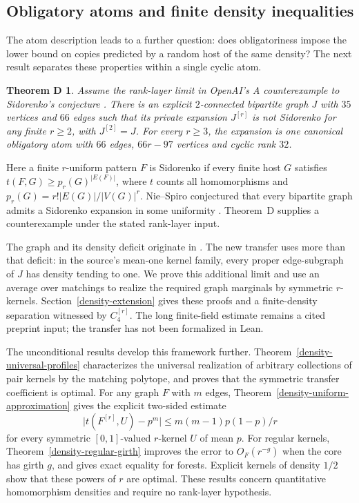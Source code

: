\documentclass[a4paper,11pt,reqno]{amsart}
\theoremstyle{plain}
\newtheorem*{theoremD}{Theorem D}
\theoremstyle{definition}
\theoremstyle{remark}
\begin{document}
\subsection*{Obligatory atoms and finite density inequalities}
The atom description leads to a further question: does obligatoriness
impose the lower bound on copies predicted by a random host of the
same density?  The next result separates these properties within a
single cyclic atom.

\begin{theoremD}
Assume the rank-layer limit in OpenAI's
\emph{A counterexample to Sidorenko's conjecture} \citep{openai161}.
There is an explicit $2$-connected bipartite graph $J$ with $35$
vertices and $66$ edges such that its private expansion $J^{[r]}$
is not Sidorenko for any finite $r\ge2$, with $J^{[2]}=J$.
For every $r\ge3$, the expansion is one canonical obligatory atom
with $66$ edges, $66r-97$ vertices and cyclic rank $32$.
\end{theoremD}

Here a finite $r$-uniform pattern $F$ is Sidorenko if every finite
host $G$ satisfies $t(F,G)\ge p_r(G)^{|E(F)|}$, where $t$ counts all
homomorphisms and $p_r(G)=r!|E(G)|/|V(G)|^r$.
Nie--Spiro conjectured that every bipartite graph admits a Sidorenko
expansion in some uniformity \citep[Conjecture~5.1]{niespiro2025}.
Theorem~D supplies a counterexample under the stated rank-layer input.

The graph and its density deficit originate in \citet{openai161}.
The new transfer uses more than that deficit: in the source's
mean-one kernel family, every proper edge-subgraph of $J$ has density
tending to one.  We prove this additional limit and use an average
over matchings to realize the required graph marginals by symmetric
$r$-kernels.  Section~\ref{density-extension} gives these proofs and
a finite-density separation witnessed by $C_4^{[r]}$.
The long finite-field estimate remains a cited preprint input;
the transfer has not been formalized in Lean.

The unconditional results develop this framework further.
Theorem~\ref{density-universal-profiles} characterizes the universal
realization of arbitrary collections of pair kernels by the matching
polytope, and proves that the symmetric transfer coefficient is optimal.
For any graph $F$ with $m$ edges, Theorem~\ref{density-uniform-approximation}
gives the explicit two-sided estimate
\[
 \bigl|t(F^{[r]},U)-p^m\bigr|
 \le m(m-1)p(1-p)/r
\]
for every symmetric $[0,1]$-valued $r$-kernel $U$ of mean $p$.
For regular kernels, Theorem~\ref{density-regular-girth} improves the
error to $O_F(r^{-g})$ when the core has girth $g$, and gives exact
equality for forests.  Explicit kernels of density $1/2$ show that
these powers of $r$ are optimal.  These results concern quantitative
homomorphism densities and require no rank-layer hypothesis.
\end{document}
